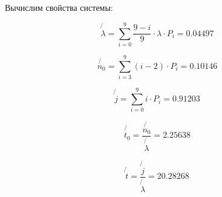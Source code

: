 Вычислим свойства системы:

\begin{equation*}
	\not{\lambda} = \sum_{i = 0}^9 \frac{9 - i}{9} \cdot \lambda \cdot P_i = 0.04497
\end{equation*}

\begin{equation*}
	\not{n_0} = \sum_{i = 3}^9 (i - 2) \cdot P_i = 0.10146
\end{equation*}

\begin{equation*}
	\not{j} = \sum_{i = 0}^9 i \cdot P_i = 0.91203
\end{equation*}

\begin{equation*}
	\not{t_0} = \frac{\not{n_0}}{\not{\lambda}} = 2.25638
\end{equation*}

\begin{equation*}
	\not{t} = \frac{\not{j}}{\not{\lambda}} = 20.28268
\end{equation*}

